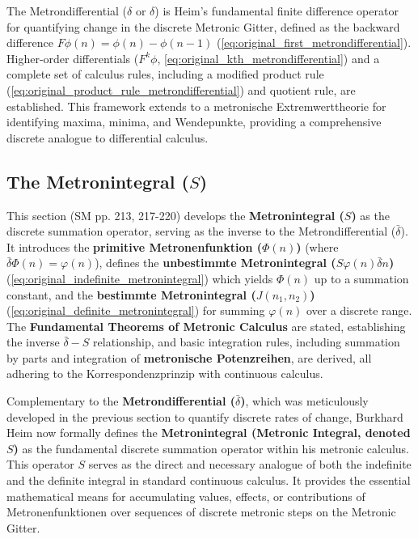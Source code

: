 \documentclass[12pt]{article}
\newcommand{\metrondifferential}{\delta}
\newcommand{\metronintegral}{S}
\begin{document}
The Metrondifferential (\(\metrondifferential\) or \(\delta\)) is Heim's fundamental finite difference operator for quantifying change in the discrete Metronic Gitter, defined as the backward difference \( F\phi(n) = \phi(n) - \phi(n-1) \) (\eqref{eq:original_first_metrondifferential}). Higher-order differentials (\(F^k\phi\), \eqref{eq:original_kth_metrondifferential}) and a complete set of calculus rules, including a modified product rule (\eqref{eq:original_product_rule_metrondifferential}) and quotient rule, are established. This framework extends to a metronische Extremwerttheorie for identifying maxima, minima, and Wendepunkte, providing a comprehensive discrete analogue to differential calculus.

\subsection{The Metronintegral (\texorpdfstring{\( \metronintegral \)}{S})}
\label{sec:metronintegral}

This section (SM pp. 213, 217-220) develops the \textbf{Metronintegral (\(\metronintegral\))} as the discrete summation operator, serving as the inverse to the Metrondifferential (\(\bar{\delta}\)). It introduces the \textbf{primitive Metronenfunktion (\(\Phi(n)\))} (where \(\bar{\delta}\Phi(n) = \varphi(n)\)), defines the \textbf{unbestimmte Metronintegral (\( S\varphi(n)\bar{\delta}n \))} (\eqref{eq:original_indefinite_metronintegral}) which yields \(\Phi(n)\) up to a summation constant, and the \textbf{bestimmte Metronintegral (\( J(n_1, n_2) \))} (\eqref{eq:original_definite_metronintegral}) for summing \(\varphi(n)\) over a discrete range. The \textbf{Fundamental Theorems of Metronic Calculus} are stated, establishing the inverse \(\bar{\delta}-S\) relationship, and basic integration rules, including summation by parts and integration of \textbf{metronische Potenzreihen}, are derived, all adhering to the Korrespondenzprinzip with continuous calculus.

Complementary to the \textbf{Metrondifferential (\( \bar{\delta} \))}, which was meticulously developed in the previous section to quantify discrete rates of change, Burkhard Heim now formally defines the \textbf{Metronintegral (Metronic Integral, denoted \( \metronintegral \))} as the fundamental discrete summation operator within his metronic calculus. This operator \( \metronintegral \) serves as the direct and necessary analogue of both the indefinite and the definite integral in standard continuous calculus. It provides the essential mathematical means for accumulating values, effects, or contributions of Metronenfunktionen over sequences of discrete metronic steps on the Metronic Gitter.
\end{document}
